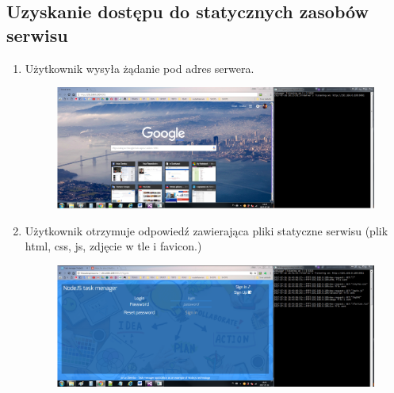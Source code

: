 \documentclass[12pt]{report}
\begin{document}
\subsection{Uzyskanie dostępu do statycznych zasobów serwisu}
\begin{enumerate}
\item Użytkownik wysyła żądanie pod adres serwera.
\begin{figure}[!t]
\centering
\includegraphics{11.png}
\end{figure}
\item Użytkownik otrzymuje odpowiedź zawierająca pliki statyczne serwisu (plik html, css, js, zdjęcie w tle i favicon.)
\begin{figure}[!t]
\centering
\includegraphics{12.png}
\end{figure}
\end{enumerate}
\end{document}
